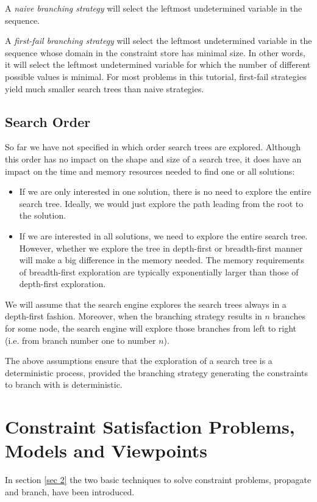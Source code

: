 \documentclass[a4paper,halfparskip]{scrartcl}
\begin{document}
A \emph{naive branching strategy} will select the 
leftmost undetermined variable in the sequence.

A \emph{first-fail branching strategy} will select 
the leftmost undetermined variable in the 
sequence whose domain in the constraint store has minimal 
size. In other words, it will select 
the leftmost undetermined variable for which the number 
of different possible values is minimal.
For most problems in this tutorial,
first-fail strategies yield much smaller 
search trees than naive strategies.

\subsection{Search Order}
So far we have not specified in which order search trees 
are explored. Although this order 
has no impact on the shape and size of a search tree, 
it does have an impact on the time and
 memory resources needed to find one or all solutions:
\begin{itemize}
\item
If we are only interested in one solution, there is no 
need to explore the entire search tree. 
Ideally, we would just explore the path leading from the 
root to the solution.
\item
If we are interested in all solutions, we need to explore 
the entire search tree. However, 
whether we explore the tree in depth-first or breadth-first 
manner will make a big difference 
in the memory needed. The memory requirements of breadth-first 
exploration are typically 
exponentially larger than those of depth-first exploration.
\end{itemize}
We will assume that the search engine explores the search trees always
in a depth-first fashion.  Moreover, when the branching strategy
results in $n$ branches for some node, the search engine will explore
those branches from left to right (i.e. from branch number one to
number $n$).

The above assumptions ensure that the exploration of a search tree is
a deterministic process, provided the branching strategy generating
the constraints to branch with is deterministic.

\newpage
\section{Constraint Satisfaction Problems, Models and Viewpoints}
In section \ref{sec 2} the two basic techniques to solve
constraint problems, propagate and branch, have been introduced.
\end{document}
